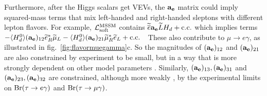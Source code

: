 \documentclass[12pt]{article}
\def\sbar{\overline}
\def\stilde{\widetilde}
\def\lagr{{\cal L}}
\def\conj{{{\rm c.c.}}}
\def\Branching{{\rm Br}}
\begin{document}
Furthermore, after the Higgs scalars get VEVs, the $\bf a_e$ matrix could
imply squared-mass terms that mix left-handed and right-handed sleptons 
with different lepton flavors. For example, $\lagr_{\rm soft}^{\rm MSSM}$
contains ${\stilde{\sbar e}} {\bf a_e} {\stilde L} H_d + \conj$ which
implies terms $ -\langle H_d^0 \rangle ({\bf a_e})_{12} \stilde e_R^*
\stilde \mu_L -\langle H_d^0 \rangle ({\bf a_e})_{21} \stilde \mu_R^*
\stilde e_L + \conj$~~These also contribute to $\mu \rightarrow e \gamma$,
as illustrated in fig.~\ref{fig:flavormuegamma}c.
So the magnitudes of $({\bf a_e})_{12}$ and $({\bf a_e})_{21}$ are also
constrained by experiment to be small, but in a way that is more strongly
dependent on other model parameters \cite{muegammatwo}.  Similarly,
$({\bf a_e})_{13}, ({\bf a_e})_{31}$ and $({\bf a_e})_{23}, ({\bf
a_e})_{32}$ are constrained, although more weakly \cite{flavorreview}, by
the experimental limits on $\Branching (\tau \rightarrow e \gamma)$ and 
$\Branching (\tau \rightarrow \mu \gamma)$. 
\end{document}

